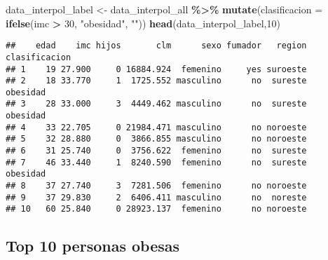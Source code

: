 \documentclass[
]{article}
\newenvironment{Shaded}{\begin{snugshade}}{\end{snugshade}}
\newcommand{\AttributeTok}[1]{\textcolor[rgb]{0.13,0.29,0.53}{#1}}
\newcommand{\DecValTok}[1]{\textcolor[rgb]{0.00,0.00,0.81}{#1}}
\newcommand{\FunctionTok}[1]{\textcolor[rgb]{0.13,0.29,0.53}{\textbf{#1}}}
\newcommand{\NormalTok}[1]{#1}
\newcommand{\OtherTok}[1]{\textcolor[rgb]{0.56,0.35,0.01}{#1}}
\newcommand{\SpecialCharTok}[1]{\textcolor[rgb]{0.81,0.36,0.00}{\textbf{#1}}}
\newcommand{\StringTok}[1]{\textcolor[rgb]{0.31,0.60,0.02}{#1}}
\begin{document}
\begin{Shaded}
\begin{Highlighting}[]
\NormalTok{data\_interpol\_label }\OtherTok{\textless{}{-}}\NormalTok{ data\_interpol\_all }\SpecialCharTok{\%\textgreater{}\%}
        \FunctionTok{mutate}\NormalTok{(}\AttributeTok{clasificacion =} \FunctionTok{ifelse}\NormalTok{(imc }\SpecialCharTok{\textgreater{}} \DecValTok{30}\NormalTok{, }\StringTok{"obesidad"}\NormalTok{, }\StringTok{""}\NormalTok{))}
\FunctionTok{head}\NormalTok{(data\_interpol\_label,}\DecValTok{10}\NormalTok{)}
\end{Highlighting}
\end{Shaded}

\begin{verbatim}
##    edad    imc hijos       clm      sexo fumador   region clasificacion
## 1    19 27.900     0 16884.924  femenino     yes suroeste              
## 2    18 33.770     1  1725.552 masculino      no  sureste      obesidad
## 3    28 33.000     3  4449.462 masculino      no  sureste      obesidad
## 4    33 22.705     0 21984.471 masculino      no noroeste              
## 5    32 28.880     0  3866.855 masculino      no noroeste              
## 6    31 25.740     0  3756.622  femenino      no  sureste              
## 7    46 33.440     1  8240.590  femenino      no  sureste      obesidad
## 8    37 27.740     3  7281.506  femenino      no noroeste              
## 9    37 29.830     2  6406.411 masculino      no  noreste              
## 10   60 25.840     0 28923.137  femenino      no noroeste
\end{verbatim}

\subsection{Top 10 personas obesas}\label{top-10-personas-obesas}

\begin{Shaded}
\end{Shaded}
\end{document}
